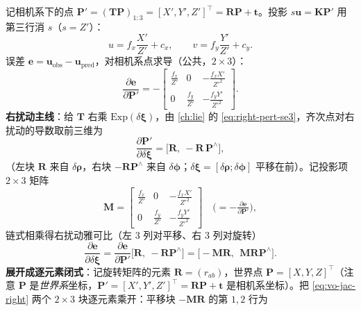 \begin{derivation}
\label{thm:vo-reproj-jac}
记相机系下的点 $\mathbf{P}'=(\mathbf{T}\mathbf{P})_{1:3}=[X',Y',Z']^\top=\mathbf{R}\mathbf{P}+\mathbf{t}$\cite{gaoxiang2019slam14}。投影 $s\mathbf{u}=\mathbf{K}\mathbf{P}'$ 用第三行消 $s$（$s=Z'$）：
\begin{equation}
  u=f_x\frac{X'}{Z'}+c_x,\qquad v=f_y\frac{Y'}{Z'}+c_y.
  \label{eq:vo-proj-uv}
\end{equation}
误差 $\mathbf{e}=\mathbf{u}_{\text{obs}}-\mathbf{u}_{\text{pred}}$，对相机系点求导（公共，$2\times3$）：
\begin{equation}
  \frac{\partial\mathbf{e}}{\partial\mathbf{P}'}=-\begin{bmatrix}\frac{f_x}{Z'}&0&-\frac{f_xX'}{Z'^2}\\[2pt]0&\frac{f_y}{Z'}&-\frac{f_yY'}{Z'^2}\end{bmatrix}.
  \label{eq:vo-de-dP}
\end{equation}
\textbf{右扰动主线}：给 $\mathbf{T}$ 右乘 $\mathrm{Exp}(\delta\boldsymbol{\xi})$，由 \cref{ch:lie} 的 \cref{eq:right-pert-se3}，齐次点对右扰动的导数取前三维为
\begin{equation}
  \frac{\partial\mathbf{P}'}{\partial\delta\boldsymbol{\xi}}=\big[\mathbf{R},\ -\mathbf{R}\,\mathbf{P}^\wedge\big],
  \label{eq:vo-dP-dxi-right}
\end{equation}
（左块 $\mathbf{R}$ 来自 $\delta\boldsymbol{\rho}$，右块 $-\mathbf{R}\mathbf{P}^\wedge$ 来自 $\delta\boldsymbol{\phi}$；$\delta\boldsymbol{\xi}=[\delta\boldsymbol{\rho};\delta\boldsymbol{\phi}]$ 平移在前）。记投影项 $2\times3$ 矩阵
\begin{equation}
  \mathbf{M}=\begin{bmatrix}\frac{f_x}{Z'}&0&-\frac{f_xX'}{Z'^2}\\[2pt]0&\frac{f_y}{Z'}&-\frac{f_yY'}{Z'^2}\end{bmatrix}
  \quad\Big(=-\tfrac{\partial\mathbf{e}}{\partial\mathbf{P}'}\Big),
  \label{eq:vo-projblock}
\end{equation}
链式相乘得右扰动雅可比（左 $3$ 列对平移、右 $3$ 列对旋转）
\begin{equation}
  \frac{\partial\mathbf{e}}{\partial\delta\boldsymbol{\xi}}
  =\frac{\partial\mathbf{e}}{\partial\mathbf{P}'}\big[\mathbf{R},\ -\mathbf{R}\mathbf{P}^\wedge\big]
  =\big[-\mathbf{M}\mathbf{R},\ \ \mathbf{M}\mathbf{R}\mathbf{P}^\wedge\big].
  \label{eq:vo-jac-right}
\end{equation}
\textbf{展开成逐元素闭式}：记旋转矩阵的元素 $\mathbf{R}=(r_{ab})$，世界点 $\mathbf{P}=[X,Y,Z]^\top$（注意 $\mathbf{P}$ 是\emph{世界系}坐标，$\mathbf{P}'=[X',Y',Z']^\top=\mathbf{R}\mathbf{P}+\mathbf{t}$ 是相机系坐标）。把 \cref{eq:vo-jac-right} 两个 $2\times3$ 块逐元素乘开：平移块 $-\mathbf{M}\mathbf{R}$ 的第 $1,2$ 行为

\end{derivation}

